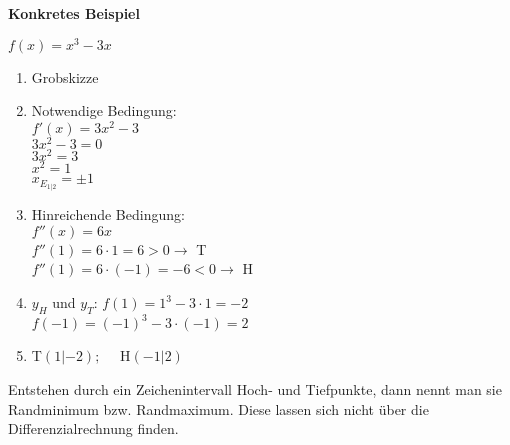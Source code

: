 \textbf{Konkretes Beispiel}

$f(x)=x^3-3x$

\begin{multicols}{2}
\begin{enumerate}
    \item Grobskizze\\
    \item Notwendige Bedingung:\\
    $f'(x)=3x^2-3$\\
    $3x^2-3=0$\\
    $3x^2=3$\\
    $x^2=1$\\
    $x_{E_{1|2}}=\pm 1$
    \item Hinreichende Bedingung:\\
    $f''(x)=6x$\\
    $f''(1)=6\cdot 1 = 6 > 0 \rightarrow$ T\\
    $f''(1)=6\cdot (-1) = -6 < 0 \rightarrow$ H\\
    \item $y_H$ und $y_T$: $f(1)=1^3-3\cdot 1=-2$\\
    $f(-1)=(-1)^3-3\cdot (-1)=2$
    \item T$(1|-2);\quad$ H$(-1|2)$
\end{enumerate}
\end{multicols}


Entstehen durch ein Zeichenintervall Hoch- und Tiefpunkte, dann nennt man sie Randminimum bzw. Randmaximum.
Diese lassen sich nicht über die Differenzialrechnung finden.

